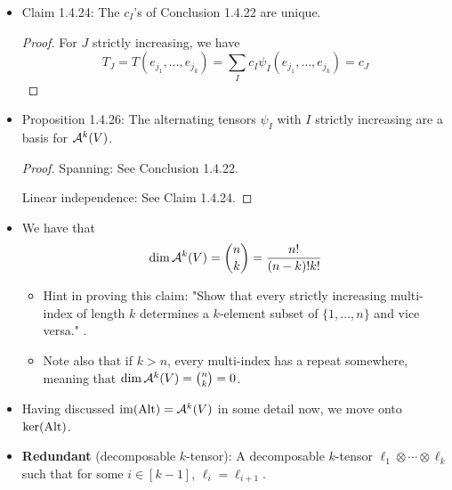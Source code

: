 \documentclass[../notes.tex]{subfiles}
\begin{document}
\begin{itemize}
\begin{proof}
\begin{equation*}
            T = \sum_Ja_Je_J^*
        \end{equation*}
        for some set of $a_J\in\R$. It follows since $\Alt(T)=k!T$ that
        \begin{equation*}
            T = \frac{1}{k!}\sum a_J\Alt(e_J^*)
            = \sum b_J\psi_J
        \end{equation*}
        We can disregard all repeating terms in the sum since they are zero by Proposition 1.4.20(2); for every non-repeating term $J$, we can write $J=I^\sigma$, where $I$ is strictly increasing and hence $\psi_J=(-1)^\sigma\psi_I$.
    \end{proof}
    \item Claim 1.4.24: The $c_I$'s of Conclusion 1.4.22 are unique.
    \begin{proof}
        For $J$ strictly increasing, we have
        \begin{equation*}
            T_J = T(e_{j_1},\dots,e_{j_k})
            = \sum_Ic_I\psi_I(e_{j_1},\dots,e_{j_k})
            = c_J
        \end{equation*}
    \end{proof}
    \item Proposition 1.4.26: The alternating tensors $\psi_I$ with $I$ strictly increasing are a basis for $\alt[k]{V}$.
    \begin{proof}
        Spanning: See Conclusion 1.4.22.\par
        Linear independence: See Claim 1.4.24.
    \end{proof}
    \item We have that
    \begin{equation*}
        \dim\alt[k]{V} = \binom{n}{k}
        = \frac{n!}{(n-k)!k!}
    \end{equation*}
    \begin{itemize}
        \item Hint in proving this claim: "Show that every strictly increasing multi-index of length $k$ determines a $k$-element subset of $\{1,\dots,n\}$ and vice versa." \parencite[16]{bib:DifferentialForms}.
        \item Note also that if $k>n$, every multi-index has a repeat somewhere, meaning that $\dim\alt[k]{V}=\binom{n}{k}=0$.
    \end{itemize}
    \item {}Having discussed $\im(\Alt)=\alt[k]{V}$ in some detail now, we move onto $\ker(\Alt)$.
    \item \textbf{Redundant} (decomposable $k$-tensor): A decomposable $k$-tensor $\ell_1\otimes\cdots\otimes\ell_k$ such that for some $i\in[k-1]$, $\ell_i=\ell_{i+1}$.

\end{itemize}
\end{document}
